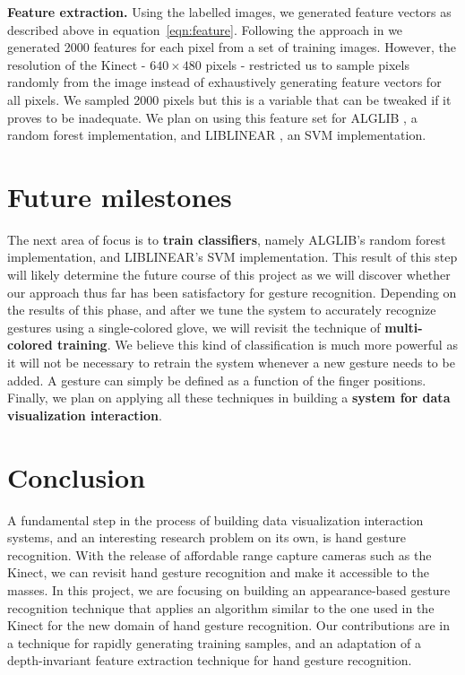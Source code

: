 \documentclass[11pt]{article}
\begin{document}
\textbf{Feature extraction.} Using the labelled images, we generated feature vectors as described above in equation~\ref{eqn:feature}. Following the approach in \cite{shotton2011} we generated 2000 features for each pixel from a set of training images. However, the resolution of the Kinect - $640 \times 480$ pixels - restricted us to sample pixels randomly from the image instead of exhaustively generating feature vectors for all pixels. We sampled 2000 pixels but this is a variable that can be tweaked if it proves to be inadequate. We plan on using this feature set for ALGLIB \cite{alglib}, a random forest implementation, and LIBLINEAR \cite{liblinear}, an SVM implementation. 

\section{Future milestones}
The next area of focus is to \textbf{train classifiers}, namely ALGLIB's random forest implementation, and LIBLINEAR's SVM implementation. This result of this step will likely determine the future course of this project as we will discover whether our approach thus far has been satisfactory for gesture recognition. Depending on the results of this phase, and after we tune the system to accurately recognize gestures using a single-colored glove, we will revisit the technique of \textbf{multi-colored training}. We believe this kind of classification is much more powerful as it will not be necessary to retrain the system whenever a new gesture needs to be added. A gesture can simply be defined as a function of the finger positions. Finally, we plan on applying all these techniques in building a \textbf{system for data visualization interaction}.

\section{Conclusion}
A fundamental step in the process of building data visualization interaction systems, and an interesting research problem on its own, is hand gesture recognition. With the release of affordable range capture cameras such as the Kinect, we can revisit hand gesture recognition and make it accessible to the masses. In this project, we are focusing on building an appearance-based gesture recognition technique that applies an algorithm similar to the one used in the Kinect for the new domain of hand gesture recognition. Our contributions are in a technique for rapidly generating training samples, and an adaptation of a depth-invariant feature extraction technique for hand gesture recognition.
\end{document}
